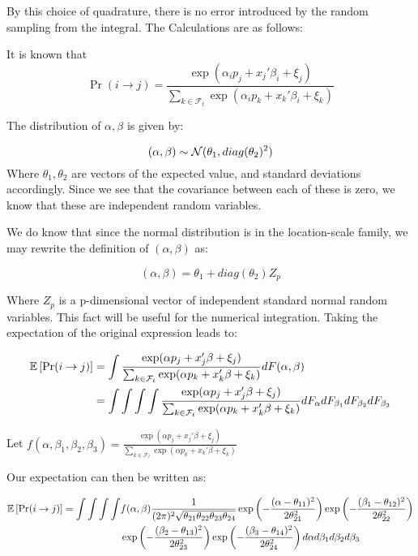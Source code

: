 \documentclass[12pt]{paper}
\begin{document}
By this choice of quadrature, there is no error introduced by the
random sampling from the integral. The Calculations are as follows:

It is known that
\begin{equation*}
  \Pr( i \rightarrow j) = \frac{\exp( \alpha_i p_j + x_j' \beta_i + \xi_j)}{\sum_{k \in
      \mathcal{F}_t} \exp( \alpha_i p_k + x_k' \beta_i + \xi_k)}
\end{equation*}

The distribution of $\alpha,\beta$ is given by:

\begin{equation*}
  (\alpha,\beta) \sim \mathcal{N}( \theta_1, diag(\theta_2)^2)
\end{equation*}
Where $\theta_1,\theta_2$ are vectors of the expected value, and standard deviations
accordingly. Since we see that the covariance between each of these is
zero, we know that these are independent random variables.

We do know that since the normal distribution is in the location-scale
family, we may rewrite the definition of $(\alpha,\beta)$ as:

\begin{equation*}
  (\alpha,\beta) = \theta_1 + diag(\theta_2) Z_p
\end{equation*}

Where $Z_p$ is a p-dimensional vector of independent standard normal
random variables. This fact will be useful for the numerical
integration. Taking the expectation of the original expression leads
to:

\begin{align*}
  \mathbb{E} \left [ \Pr( i \rightarrow j) \right ] &= \int\frac{\exp( \alpha p_j + x_j' \beta + \xi_j)}{\sum_{k \in
                      \mathcal{F}_t} \exp( \alpha p_k + x_k' \beta + \xi_k)} dF(\alpha,\beta)\\
                    &=  \int \int \int \int\frac{\exp( \alpha p_j + x_j' \beta + \xi_j)}{\sum_{k \in
                      \mathcal{F}_t} \exp( \alpha p_k + x_k' \beta + \xi_k)} dF_{\alpha}
                      dF_{\beta_1} dF_{\beta_2} dF_{\beta_3}
\end{align*}

Let
$f(\alpha,\beta_1,\beta_2,\beta_3) = \frac{\exp( \alpha p_j + x_j' \beta + \xi_j)}{\sum_{k \in \mathcal{F}_t}
  \exp( \alpha p_k + x_k' \beta + \xi_k)}$

Our expectation can then be written as:

\begin{align*}
  \mathbb{E} \left [ \Pr( i \rightarrow j) \right ] = \int \int \int \int &f(\alpha,\beta) \frac{1}{(2 \pi)^2
                      \sqrt{\theta_{21}\theta_{22}\theta_{23}\theta_{24}}} \exp\left( -
                      \frac{(\alpha-\theta_{11})^2}{2 \theta_{21}^2} \right) \exp\left( -
                      \frac{(\beta_1-\theta_{12})^2}{2 \theta_{22}^2} \right)\\
  &  \exp\left( -
                      \frac{(\beta_2-\theta_{13})^2}{2 \theta_{23}^2} \right) \exp\left( -
                      \frac{(\beta_3-\theta_{14})^2}{2 \theta_{24}^2} \right) d\alpha
                      d\beta_1 d\beta_2 d\beta_3
\end{align*}
\end{document}
